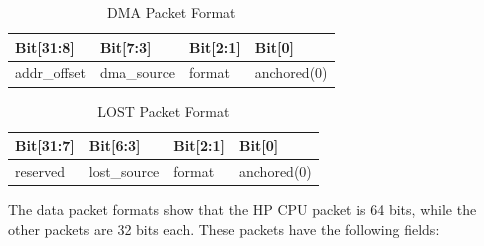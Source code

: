 \documentclass[main\_\_EN.tex]{subfiles}
\begin{document}
\begin{longtable}[c]{|L{2cm}|L{2cm}|L{2cm}|L{2cm}|}
    \caption{DMA Packet Format}\label{tab:dbgassist-dma-package}
    \\\hline
    \textbf{Bit[31:8]} & \textbf{Bit[7:3]} & \textbf{Bit[2:1]} & \textbf{Bit[0]} \\\hline
    addr\_offset & dma\_source & format & anchored(0) \\\hline
\end{longtable}

\begin{longtable}[c]{|L{2cm}|L{2cm}|L{2cm}|L{2cm}|}
    \caption{LOST Packet Format}\label{tab:dbgassist-lost-package}
    \\\hline
    \textbf{Bit[31:7]} & \textbf{Bit[6:3]} & \textbf{Bit[2:1]} & \textbf{Bit[0]} \\\hline
    reserved & lost\_source & format & anchored(0) \\\hline
\end{longtable}

The data packet formats show that the HP CPU packet is 64 bits, while the other packets are 32 bits each. These packets have the following fields:
\end{document}
